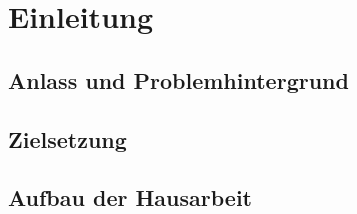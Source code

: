 \documentclass[../main.tex]{subfiles}
\begin{document}
  \section{Einleitung}

  \subsection{Anlass und Problemhintergrund}

  \subsection{Zielsetzung}

  \subsection{Aufbau der Hausarbeit}
\end{document}
